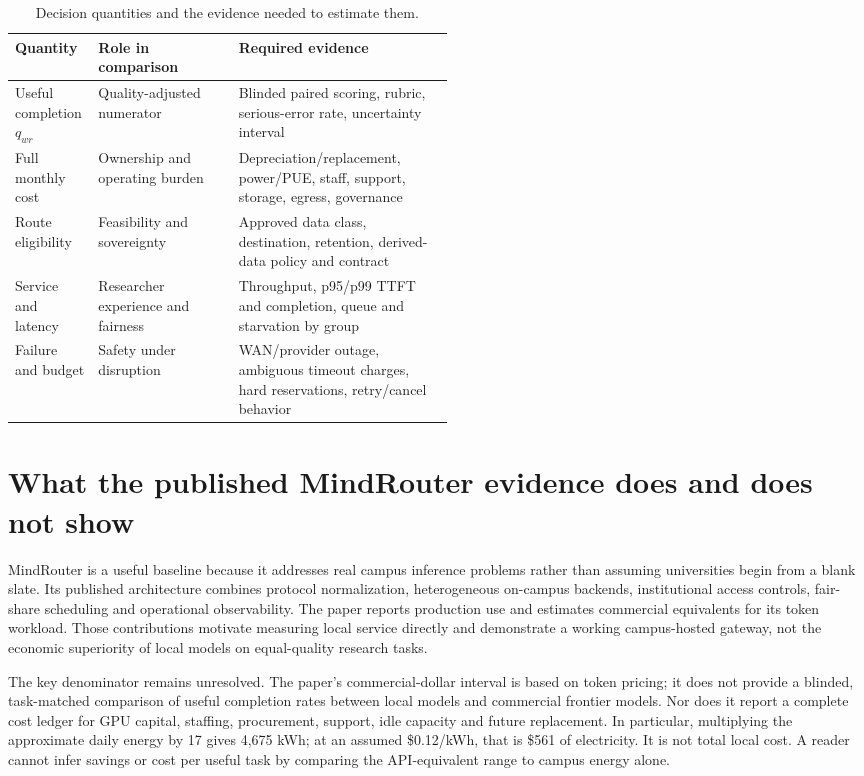 \begin{table}[ht]
\centering\small
\caption{Decision quantities and the evidence needed to estimate them.}
\begin{tabularx}{\linewidth}{p{0.19\linewidth}p{0.32\linewidth}X}
\toprule
Quantity & Role in comparison & Required evidence \\
\midrule
Useful completion $q_{wr}$ & Quality-adjusted numerator & Blinded paired scoring, rubric, serious-error rate, uncertainty interval \\
Full monthly cost & Ownership and operating burden & Depreciation/replacement, power/PUE, staff, support, storage, egress, governance \\
Route eligibility & Feasibility and sovereignty & Approved data class, destination, retention, derived-data policy and contract \\
Service and latency & Researcher experience and fairness & Throughput, p95/p99 TTFT and completion, queue and starvation by group \\
Failure and budget & Safety under disruption & WAN/provider outage, ambiguous timeout charges, hard reservations, retry/cancel behavior \\
\bottomrule
\end{tabularx}
\end{table}

\section{What the published MindRouter evidence does and does not show}
MindRouter is a useful baseline because it addresses real campus inference problems rather than assuming universities begin from a blank slate. Its published architecture combines protocol normalization, heterogeneous on-campus backends, institutional access controls, fair-share scheduling and operational observability. The paper reports production use and estimates commercial equivalents for its token workload. Those contributions motivate measuring local service directly and demonstrate a working campus-hosted gateway, not the economic superiority of local models on equal-quality research tasks.

The key denominator remains unresolved. The paper's commercial-dollar interval is based on token pricing; it does not provide a blinded, task-matched comparison of useful completion rates between local models and commercial frontier models. Nor does it report a complete cost ledger for GPU capital, staffing, procurement, support, idle capacity and future replacement. In particular, multiplying the approximate daily energy by 17 gives 4,675 kWh; at an assumed \$0.12/kWh, that is \$561 of electricity. It is not total local cost. A reader cannot infer savings or cost per useful task by comparing the API-equivalent range to campus energy alone.

